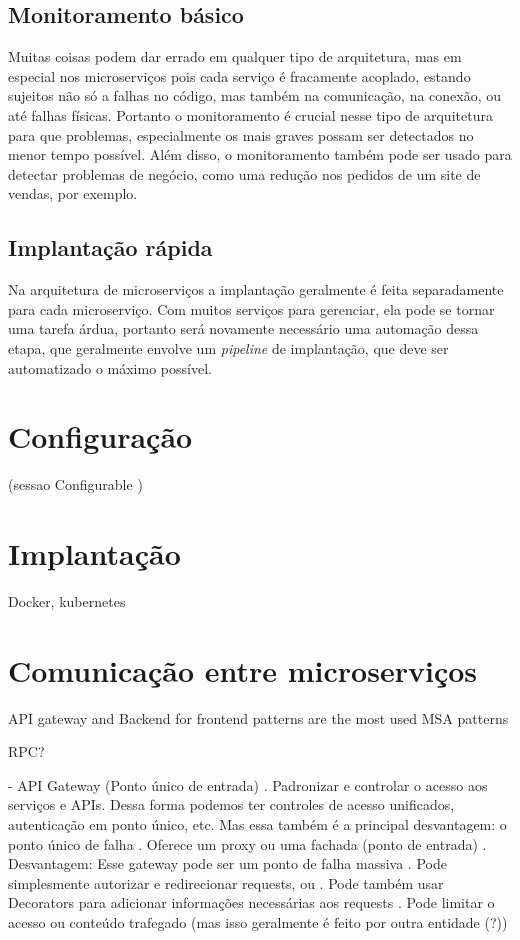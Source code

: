 \subsection{Monitoramento básico}

Muitas coisas podem dar errado em qualquer tipo de arquitetura, mas em especial nos microserviços pois cada serviço é fracamente acoplado, estando sujeitos não só a falhas no código, mas também na comunicação, na conexão, ou até falhas físicas. Portanto o monitoramento é crucial nesse tipo de arquitetura para que problemas, especialmente os mais graves possam ser detectados no menor tempo possível. Além disso, o monitoramento também pode ser usado para detectar problemas de negócio, como uma redução nos pedidos de um site de vendas, por exemplo. \cite{MartinFowlerMicroservices}

\subsection{Implantação rápida}

Na arquitetura de microserviços a implantação geralmente é feita separadamente para cada microserviço. Com muitos serviços para gerenciar, ela pode se tornar uma tarefa árdua, portanto será novamente necessário uma automação dessa etapa, que geralmente envolve um \emph{pipeline} de implantação, que deve ser automatizado o máximo possível. \cite{MartinFowlerMicroservices}

\section{Configuração}

(sessao Configurable \cite{Familiar2015})

\section{Implantação}

Docker, kubernetes

\section{Comunicação entre microserviços}

API gateway and Backend for frontend patterns are the most used MSA patterns \cite{design-monitoring-testing-waseem}

RPC?

- API Gateway (Ponto único de entrada)
    . Padronizar e controlar o acesso aos serviços e APIs. Dessa forma podemos ter controles de acesso unificados, autenticação em ponto único, etc. Mas essa também é a principal desvantagem: o ponto único de falha
    . Oferece um proxy ou uma fachada (ponto de entrada)
    . Desvantagem: Esse gateway pode ser um ponto de falha massiva
    . Pode simplesmente autorizar e redirecionar requests, ou
    . Pode também usar Decorators para adicionar informações necessárias aos requests
    . Pode limitar o acesso ou conteúdo trafegado (mas isso geralmente é feito por outra entidade (?))

